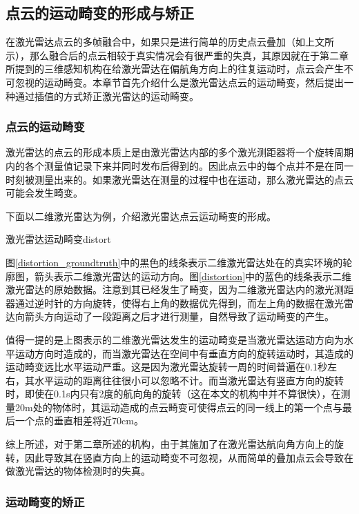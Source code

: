 \subsection{点云的运动畸变的形成与矫正}
在激光雷达点云的多帧融合中，如果只是进行简单的历史点云叠加（如上文所示），那么融合后的点云相较于真实情况会有很严重的失真，其原因就在于第二章所提到的三维感知机构在给激光雷达在偏航角方向上的往复运动时，点云会产生不可忽视的运动畸变。本章节首先介绍什么是激光雷达点云的运动畸变，然后提出一种通过插值的方式矫正激光雷达的运动畸变。

\subsubsection{点云的运动畸变}
激光雷达的点云的形成本质上是由激光雷达内部的多个激光测距器将一个旋转周期内的各个测量值记录下来并同时发布后得到的。因此点云中的每个点并不是在同一时刻被测量出来的。如果激光雷达在测量的过程中也在运动，那么激光雷达的点云可能会发生畸变。

下面以二维激光雷达为例，介绍激光雷达点云运动畸变的形成。

\begin{pics}[htbp]{激光雷达运动畸变}{distort}
\end{pics}

图\ref{distortion_groundtruth}中的黑色的线条表示二维激光雷达处在的真实环境的轮廓图，箭头表示二维激光雷达的运动方向。图\ref{distortion}中的蓝色的线条表示二维激光雷达的原始数据。注意到其已经发生了畸变，因为二维激光雷达内的激光测距器通过逆时针的方向旋转，使得右上角的数据优先得到，而左上角的数据在激光雷达向箭头方向运动了一段距离之后才进行测量，自然导致了运动畸变的产生。

值得一提的是上图表示的二维激光雷达发生的运动畸变是当激光雷达运动方向为水平运动方向时造成的，而当激光雷达在空间中有垂直方向的旋转运动时，其造成的运动畸变远比水平运动严重。这是因为激光雷达旋转一周的时间普遍在0.1秒左右，其水平运动的距离往往很小可以忽略不计。而当激光雷达有竖直方向的旋转时，即使在0.1s内只有2度的航向角的旋转（这在本文的机构中并不算很快），在测量20m处的物体时，其运动造成的点云畸变可使得点云的同一线上的第一个点与最后一个点的垂直相差将近70cm。

综上所述，对于第二章所述的机构，由于其施加了在激光雷达航向角方向上的旋转，因此导致其在竖直方向上的运动畸变不可忽视，从而简单的叠加点云会导致在做激光雷达的物体检测时的失真。

\subsubsection{运动畸变的矫正}

